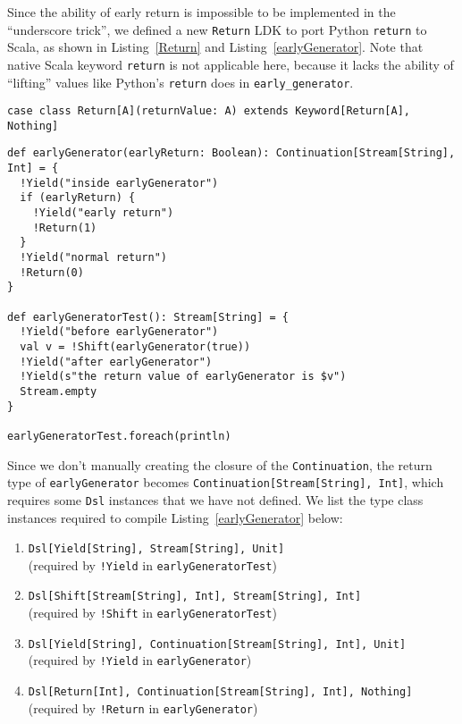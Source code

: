 Since the ability of early return is impossible to be implemented in the ``underscore trick'', we defined a new \lstinline{Return} LDK to port Python \lstinline{return} to Scala, as shown in Listing~\ref{Return} and Listing~\ref{earlyGenerator}. Note that native Scala keyword \lstinline{return} is not applicable here, because it lacks the ability of ``lifting'' values like Python's \lstinline{return} does in \lstinline{early_generator}.

\begin{lstlisting}[caption={The definition of \lstinline{Return} LDK},label={Return}]
case class Return[A](returnValue: A) extends Keyword[Return[A], Nothing]
\end{lstlisting}

\begin{lstlisting}[caption={Use \lstinline{Shift} and \lstinline{Return} in LDK-based generators},label={earlyGenerator}]
def earlyGenerator(earlyReturn: Boolean): Continuation[Stream[String], Int] = {
  !Yield("inside earlyGenerator")
  if (earlyReturn) {
    !Yield("early return")
    !Return(1)
  }
  !Yield("normal return")
  !Return(0)
}

def earlyGeneratorTest(): Stream[String] = {
  !Yield("before earlyGenerator")
  val v = !Shift(earlyGenerator(true))
  !Yield("after earlyGenerator")
  !Yield(s"the return value of earlyGenerator is $v")
  Stream.empty
}

earlyGeneratorTest.foreach(println)
\end{lstlisting}

Since we don't manually creating the closure of the \lstinline{Continuation}, the return type of \lstinline{earlyGenerator} becomes \lstinline{Continuation[Stream[String], Int]}, which requires some \lstinline{Dsl} instances that we have not defined. We list the type class instances required to compile Listing~\ref{earlyGenerator} below:

\begin{enumerate}
  \item \lstinline{Dsl[Yield[String], Stream[String], Unit]} \\ (required by \lstinline{!Yield} in \lstinline{earlyGeneratorTest})
  \label{DslYield}

  \item \lstinline{Dsl[Shift[Stream[String], Int], Stream[String], Int]} \\ (required by \lstinline{!Shift} in \lstinline{earlyGeneratorTest})
  \label{DslShift}
  
  \item \lstinline{Dsl[Yield[String], Continuation[Stream[String], Int], Unit]} \\ (required by \lstinline{!Yield} in \lstinline{earlyGenerator})
  \label{DslYieldContinuation}
  
  \item \lstinline{Dsl[Return[Int], Continuation[Stream[String], Int], Nothing]} \\ (required by \lstinline{!Return} in \lstinline{earlyGenerator})
  \label{DslReturn}
\end{enumerate}

